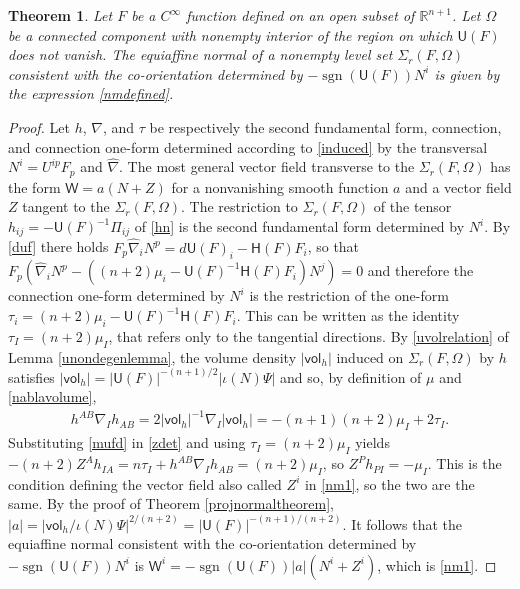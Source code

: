 \documentclass [leqno, 10pt]{amsart}
\newtheorem{theorem}{Theorem}[section]
\theoremstyle{definition}
\numberwithin{equation}{section}
\newcommand{\muf}{\mu}
\newcommand{\gn}{N}
\newcommand{\Om}{\Omega}
\newcommand{\imt}{\iota}
\newcommand{\U}{\mathsf{U}}
\newcommand{\lc}{\Sigma}
\renewcommand{\H}{\mathsf{H}}
\newcommand{\vol}{\mathsf{vol}}
\newcommand{\sff}{\Pi}
\newcommand{\nm}{\mathsf{W}}
\newcommand{\cinf}{C^{\infty}}
\newcommand{\sign}{\operatorname{sgn}}
\newcommand{\hnabla}{\widehat{\nabla}}
\newcommand{\rea}{\mathbb R}
\begin{document}
\begin{theorem}\label{affinenormalsametheorem}
Let $F$ be a $\cinf$ function defined on an open subset of $\rea^{n+1}$. Let $\Omega$ be a connected component with nonempty interior of the region on which $\U(F)$ does not vanish.
The equiaffine normal of a nonempty level set $\lc_{r}(F, \Omega)$ consistent with the co-orientation determined by $-\sign(\U(F))N^{i}$ is given by the expression \eqref{nmdefined}. 
\end{theorem}
\begin{proof}
Let $h$, $\nabla$, and $\tau$ be respectively the second fundamental form, connection, and connection one-form determined according to \eqref{induced} by the transversal $\gn^{i} = U^{ip}F_{p}$ and $\hnabla$. The most general vector field transverse to the $\lc_{r}(F, \Omega)$ has the form $\nm = a(\gn + Z)$ for a nonvanishing smooth function $a$ and a vector field $Z$ tangent to the $\lc_{r}(F, \Omega)$. The restriction to $\lc_{r}(F, \Om)$ of the tensor $h_{ij} = -\U(F)^{-1}\sff_{ij}$ of \eqref{hn} is the second fundamental form determined by $N^{i}$. By \eqref{duf} there holds $F_{p}\hnabla_{i}N^{p} = d\U(F)_{i} - \H(F)F_{i}$, so that $F_{p}(\hnabla_{i}N^{p} - ((n+2)\muf_{i} - \U(F)^{-1}\H(F)F_{i})N^{j}) = 0$ and therefore the connection one-form determined by $N^{i}$ is the restriction of the one-form $\tau _{i} = (n+2)\muf_{i} - \U(F)^{-1}\H(F)F_{i}$.
This can be written as the identity $\tau_{I} = (n+2)\muf_{I}$, that refers only to the tangential directions. By \eqref{uvolrelation} of Lemma \ref{unondegenlemma}, the volume density $|\vol_{h}|$ induced on $\lc_{r}(F, \Omega)$ by $h$ satisfies $|\vol_{h}| = |\U(F)|^{-(n+1)/2}|\imt(N)\Psi|$ and so, by definition of $\muf$ and \eqref{nablavolume},
\begin{align}\label{mufd}
 h^{AB}\nabla_{I}h_{AB} = 2|\vol_{h}|^{-1}\nabla_{I}|\vol_{h}| = - (n+1)(n+2)\muf_{I} + 2\tau_{I}.
\end{align}
Substituting \eqref{mufd} in \eqref{zdet} and using $\tau_{I} = (n+2)\muf_{I}$ yields $-(n+2)Z^{A}h_{IA} = n\tau_{I} + h^{AB}\nabla_{I}h_{AB} = (n+2)\muf_{I}$, so $Z^{P}h_{PI} = -\muf_{I}$. This is the condition defining the vector field also called $Z^{i}$ in \eqref{nm1}, so the two are the same. By the proof of Theorem \ref{projnormaltheorem}, $|a| = |\vol_{h}/\imt(\gn)\Psi|^{2/(n+2)} = |\U(F)|^{-(n+1)/(n+2)}$. It follows that the equiaffine normal consistent with the co-orientation determined by $-\sign(\U(F))N^{i}$ is $\nm^{i} = -\sign(\U(F))|a|(N^{i} + Z^{i})$, which is \eqref{nm1}. 
\end{proof}
\end{document}

